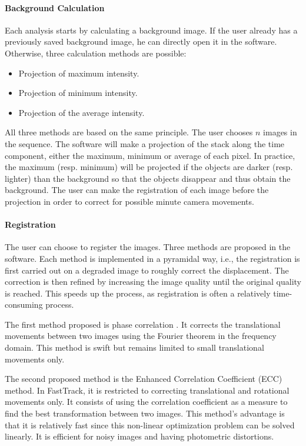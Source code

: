     \paragraph{Background Calculation}
    Each analysis starts by calculating a background image. If the user already has a previously saved background image, he can directly open it in the software. Otherwise, three calculation methods are possible:
    \begin{itemize}
        \item Projection of maximum intensity.
        \item Projection of minimum intensity.
        \item Projection of the average intensity.
    \end{itemize}
    All three methods are based on the same principle. The user chooses $n$ images in the sequence. The software will make a projection of the stack along the time component, either the maximum, minimum or average of each pixel. In practice, the maximum (resp. minimum) will be projected if the objects are darker (resp. lighter) than the background so that the objects disappear and thus obtain the background. The user can make the registration of each image before the projection in order to correct for possible minute camera movements.

    \paragraph{Registration}
    The user can choose to register the images. Three methods are proposed in the software. Each method is implemented in a pyramidal way, i.e., the registration is first carried out on a degraded image to roughly correct the displacement. The correction is then refined by increasing the image quality until the original quality is reached. This speeds up the process, as registration is often a relatively time-consuming process.

    The first method proposed is phase correlation \cite{stone2001fast}. It corrects the translational movements between two images using the Fourier theorem in the frequency domain. This method is swift but remains limited to small translational movements only.

    The second proposed method is the Enhanced Correlation Coefficient (ECC) \cite{evangelidis2008parametric} method. In FastTrack, it is restricted to correcting translational and rotational movements only. It consists of using the correlation coefficient as a measure to find the best transformation between two images. This method's advantage is that it is relatively fast since this non-linear optimization problem can be solved linearly. It is efficient for noisy images and having photometric distortions.

